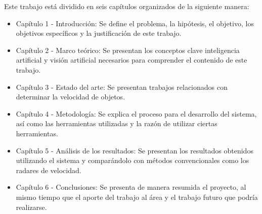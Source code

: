 Este trabajo está dividido en seis capítulos organizados de la siguiente manera:


\begin{itemize}
\item Capítulo 1 - Introducción: Se define el problema, la hipótesis, el objetivo, los objetivos específicos y la justificación de este trabajo.

\item Capítulo 2 - Marco teórico: Se presentan los conceptos clave inteligencia artificial y visión artificial necesarios para comprender el contenido de este trabajo.

\item Capítulo 3 - Estado del arte: Se presentan trabajos relacionados con determinar la velocidad de objetos.

\item Capítulo 4 - Metodología: Se explica el proceso para el desarrollo del sistema, así como las herramientas utilizadas y la razón de utilizar ciertas herramientas.

\item Capítulo 5 - Análisis de los resultados: Se presentan los resultados obtenidos utilizando el sistema y comparándolo con métodos convencionales como los radares de velocidad.

\item Capítulo 6 - Conclusiones: Se presenta de manera resumida el proyecto, al mismo tiempo que el aporte del trabajo al área y el trabajo futuro que podría realizarse.
\end{itemize}
